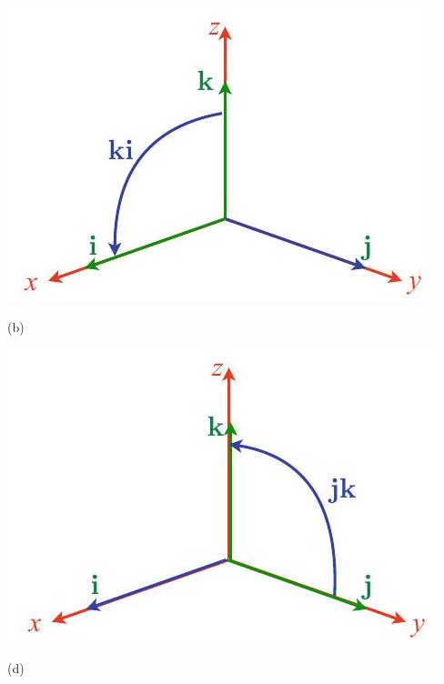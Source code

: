 \documentclass[10pt]{article}
\begin{document}
\begin{center}
\includegraphics[max width=\textwidth]{2023_04_20_41f1ceac5a31dc7d1b59g-089}
\end{center}

(b)

\begin{center}
\includegraphics[max width=\textwidth]{2023_04_20_41f1ceac5a31dc7d1b59g-089(2)}
\end{center}

(d)
\end{document}
